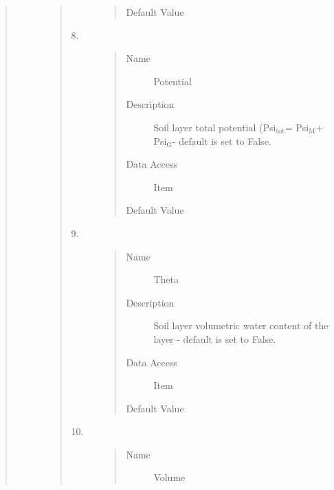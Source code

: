 \documentclass[letterpaper,10pt,english]{sphinxmanual}
\begin{document}
\begin{quote}
\begin{description}
\begin{quote}
\begin{description}
\begin{quote}
\begin{description}
\item[{Default Value}] \leavevmode
{}

\end{description}\end{quote}

\item[{8.}] \leavevmode\begin{quote}\begin{description}
\item[{Name}] \leavevmode
Potential

\item[{Description}] \leavevmode
Soil layer total potential (Psi$_{\text{tot}}$= Psi$_{\text{M}}$+ Psi$_{\text{G}}$- default is set to False.

\item[{Data Access}] \leavevmode
Item

\item[{Default Value}] \leavevmode
{}

\end{description}\end{quote}

\item[{9.}] \leavevmode\begin{quote}\begin{description}
\item[{Name}] \leavevmode
Theta

\item[{Description}] \leavevmode
Soil layer volumetric water content of the layer - default is set to False.

\item[{Data Access}] \leavevmode
Item

\item[{Default Value}] \leavevmode
{}

\end{description}\end{quote}

\item[{10.}] \leavevmode\begin{quote}\begin{description}
\item[{Name}] \leavevmode
Volume


\end{description}
\end{quote}
\end{description}
\end{quote}
\end{description}
\end{quote}
\end{document}

